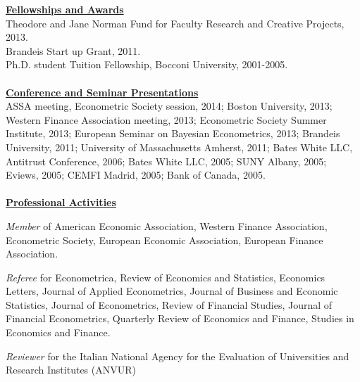 \documentclass[12pt]{article}
\begin{document}
\underline{\textbf{Fellowships and Awards}}\\
Theodore and Jane Norman Fund for Faculty Research and Creative Projects, 2013. \\
Brandeis Start up Grant, 2011. \\
Ph.D. student Tuition Fellowship, Bocconi University, 2001-2005.\\ \\
\underline{\textbf{Conference and Seminar Presentations}}\\
ASSA meeting, Econometric Society session, 2014; Boston University, 2013; Western Finance Association meeting, 2013; Econometric Society Summer Institute, 2013; European Seminar on Bayesian Econometrics, 2013; Brandeis University, 2011; University of Massachusetts Amherst, 2011; Bates White LLC, Antitrust Conference, 2006; Bates White LLC, 2005; SUNY Albany, 2005; Eviews, 2005; CEMFI Madrid, 2005; Bank of Canada, 2005.\\ \\
\underline{\textbf{Professional Activities}}
\begin{description}
	\item\emph{Member} of American Economic Association, Western Finance Association, Econometric Society, European Economic Association, European Finance Association.

\item \emph{Referee} for Econometrica, Review of Economics and Statistics, Economics Letters, Journal of Applied Econometrics, Journal of Business and Economic Statistics, Journal of Econometrics, Review of Financial Studies, Journal of Financial Econometrics, Quarterly Review of Economics and Finance, Studies in Economics and Finance.

\item \emph{Reviewer} for the Italian National Agency for the Evaluation of Universities and Research Institutes (ANVUR) 
\end{description}
 
\end{document}

